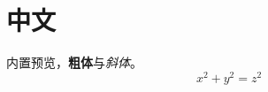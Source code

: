 \documentclass[fontset=fandol]{ctexart}
\begin{document}
\section{中文}内置预览，\textbf{粗体}与\textit{斜体}。\[x^2+y^2=z^2\]
\end{document}
